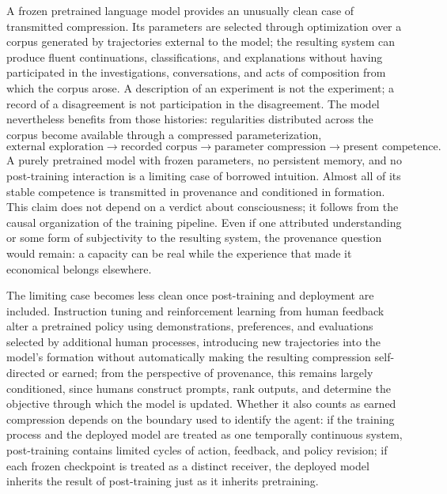 A frozen pretrained language model provides an unusually clean case of transmitted compression. Its parameters are selected through optimization over a corpus generated by trajectories external to the model; the resulting system can produce fluent continuations, classifications, and explanations without having participated in the investigations, conversations, and acts of composition from which the corpus arose. A description of an experiment is not the experiment; a record of a disagreement is not participation in the disagreement. The model nevertheless benefits from those histories: regularities distributed across the corpus become available through a compressed parameterization,
\[
\text{external exploration} \to \text{recorded corpus} \to \text{parameter compression} \to \text{present competence}.
\]
A purely pretrained model with frozen parameters, no persistent memory, and no post-training interaction is a limiting case of borrowed intuition. Almost all of its stable competence is transmitted in provenance and conditioned in formation. This claim does not depend on a verdict about consciousness; it follows from the causal organization of the training pipeline. Even if one attributed understanding or some form of subjectivity to the resulting system, the provenance question would remain: a capacity can be real while the experience that made it economical belongs elsewhere.

The limiting case becomes less clean once post-training and deployment are included. Instruction tuning and reinforcement learning from human feedback alter a pretrained policy using demonstrations, preferences, and evaluations selected by additional human processes, introducing new trajectories into the model's formation without automatically making the resulting compression self-directed or earned; from the perspective of provenance, this remains largely conditioned, since humans construct prompts, rank outputs, and determine the objective through which the model is updated. Whether it also counts as earned compression depends on the boundary used to identify the agent: if the training process and the deployed model are treated as one temporally continuous system, post-training contains limited cycles of action, feedback, and policy revision; if each frozen checkpoint is treated as a distinct receiver, the deployed model inherits the result of post-training just as it inherits pretraining.

